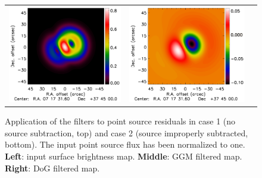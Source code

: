 \documentclass[twocolumn,traditabstract]{aa}
\begin{document}
\begin{figure}[h]
{\begin{tabular}{lll}
\includegraphics[trim=2.3cm 0.7cm 0cm 0cm, clip=true, scale=1]{Figure/PSalone_GGM_PointSourceResidual_15_15_45.pdf} & 
\includegraphics[trim=2.3cm 0.7cm 0cm 0cm, clip=true, scale=1]{Figure/PSalone_DoG_PointSourceResidual_15_15_45.pdf} 
\end{tabular}}
\caption{\footnotesize{Application of the filters to point source residuals in case 1 (no source subtraction, top) and case 2 (source improperly subtracted, bottom). The input point source flux has been normalized to one. {\bf Left}: input surface brightness map. {\bf Middle}: GGM filtered map. {\bf Right}: DoG filtered map.}}
\label{fig:Point_source_maps}
\end{figure}
\end{document}
